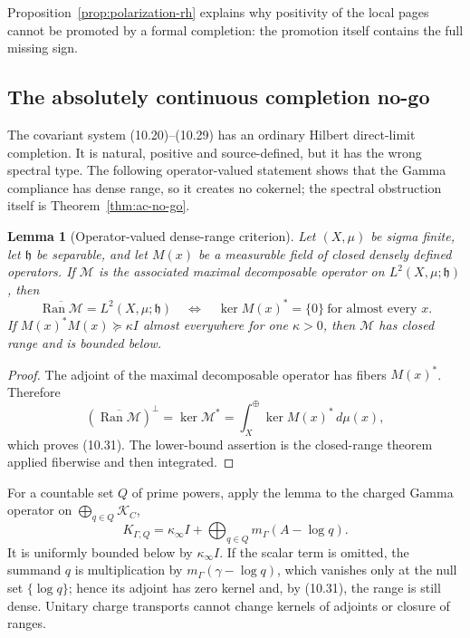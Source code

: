 \documentclass[11pt]{amsart}
\newtheorem{lemma}[theorem]{Lemma}
\theoremstyle{definition}
\theoremstyle{remark}
\newcommand{\dd}{\,d}
\begin{document}
Proposition~\ref{prop:polarization-rh} explains why positivity of the local
pages cannot be promoted by a formal completion: the promotion itself
contains the full missing sign.

\subsection{The absolutely continuous completion no-go}

The covariant system (10.20)--(10.29) has an ordinary Hilbert direct-limit
completion.  It is natural, positive and source-defined, but it has the
wrong spectral type.  The following operator-valued statement shows that the
Gamma compliance has dense range, so it creates no cokernel; the spectral
obstruction itself is Theorem~\ref{thm:ac-no-go}.

\begin{lemma}[Operator-valued dense-range criterion]
\label{lem:operator-dense-range}
Let \((X,\mu)\) be sigma finite, let \(\mathfrak h\) be separable, and let
\(M(x)\) be a measurable field of closed densely defined operators.  If
\(\mathcal M\) is the associated maximal decomposable operator on
\(L^2(X,\mu;\mathfrak h)\), then
\[
 \boxed{
 \overline{\operatorname{Ran}\mathcal M}
 =L^2(X,\mu;\mathfrak h)
 \quad\Longleftrightarrow\quad
 \ker M(x)^*=\{0\}\ \text{for almost every }x.}
 \tag{10.31}
\]
If \(M(x)^*M(x)\succeq\kappa I\) almost everywhere for one
\(\kappa>0\), then \(\mathcal M\) has closed range and is bounded below.
\end{lemma}

\begin{proof}
The adjoint of the maximal decomposable operator has fibers \(M(x)^*\).
Therefore
\[
 (\overline{\operatorname{Ran}\mathcal M})^\perp
 =\ker\mathcal M^*
 =\int_X^\oplus\ker M(x)^*\dd\mu(x),
\]
which proves (10.31).  The lower-bound assertion is the closed-range
theorem applied fiberwise and then integrated.
\end{proof}

For a countable set \(Q\) of prime powers, apply the lemma to the charged
Gamma operator on \(\bigoplus_{q\in Q}\mathscr K_C\),
\[
 K_{\Gamma,Q}
 =\kappa_\infty I+\bigoplus_{q\in Q}m_\Gamma(A-\log q).
 \tag{10.32}
\]
It is uniformly bounded below by \(\kappa_\infty I\).  If the scalar term
is omitted, the summand \(q\) is multiplication by \(m_\Gamma(\gamma-\log q)\),
which vanishes only at the null set \(\{\log q\}\); hence its adjoint has
zero kernel and, by (10.31), the range is still dense.  Unitary charge transports cannot change kernels
of adjoints or closure of ranges.
\end{document}
